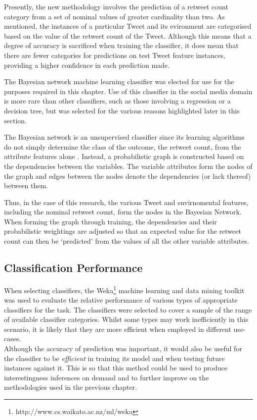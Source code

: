 Presently, the new methodology involves the prediction of a retweet count category from a set of nominal values of greater cardinality than two. As mentioned, the instances of a particular Tweet and its evironment are categorised based on the value of the retweet count of the Tweet. Although this means that a degree of accuracy is sacrificed when training the classifier, it does mean that there are fewer categories for predictions on test Tweet feature instances, providing a higher confidence in each prediction made.

The Bayesian network machine learning classifier was elected for use for the purposes required in this chapter. Use of this classifier in the social media domain is more rare than other classifiers, such as those involving a regression or a decision tree, but was selected for the various reasons highlighted later in this section.

The Bayesian network is an unsupervised classifier since its learning algorithms do not simply determine the class of the outcome, the retweet count, from the attribute features alone \cite{friedman97}. Instead, a probabilistic graph is constructed based on the dependencies between the variables. The variable attributes form the nodes of the graph and edges between the nodes denote the dependencies (or lack thereof) between them.

Thus, in the case of this research, the various Tweet and envirnomental features, including the nominal retweet count, form the nodes in the Bayesian Network. When forming the graph through training, the dependencies and their probabilistic weightings are adjusted so that an expected value for the retweet count can then be `predicted' from the values of all the other variable attributes.


\subsection{Classification Performance}
When selecting classifiers, the Weka\footnote{http://www.cs.waikato.ac.nz/ml/weka} machine learning and data mining toolkit was used to evaluate the relative performance of various types of appropriate classifiers for the task. The classifiers were selected to cover a sample of the range of available classifier categories. Whilst some types may work inefficiently in this scenario, it is likely that they are more efficient when employed in different use-cases.\\
Although the accuracy of prediction was important, it would also be useful for the classifier to be \textit{efficient} in training its model and when testing future instances against it. This is so that this method could be used to produce interestingness inferences on demand and to further improve on the methodologies used in the previous chapter.

